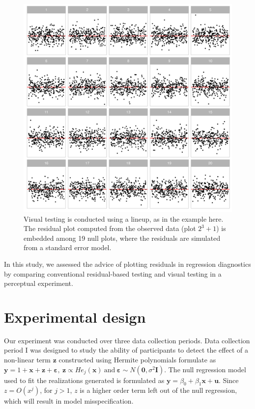 \documentclass{vgtc}                          %
\begin{document}
\begin{figure}[tb]
 \centering %
 \includegraphics[width=\columnwidth]{131}
 \caption{Visual testing is conducted using a lineup, as in the example here. The residual plot computed from the observed data (plot $2^3 + 1$) is embedded among 19 null plots, where the residuals are simulated from a standard error model.}
 \label{fig:first-example-lineup}
\end{figure}

In this study, we assessed the advice of plotting residuals in regression 
diagnostics by comparing conventional residual-based testing 
and visual testing in a perceptual experiment.

\section{Experimental design}
\label{sec:experimental-design}

Our experiment was conducted over three data collection periods. 
Data collection period I was designed to study the ability of
participants to detect the effect of a non-linear term
\(\boldsymbol{z}\) constructed using Hermite polynomials formulate as \(\boldsymbol{y} = 1 + \boldsymbol{x} + \boldsymbol{z} + \boldsymbol{\varepsilon},~ \boldsymbol{z} \propto He_j(\boldsymbol{x}) ~\text{and}~ \boldsymbol{\varepsilon} \sim N(\boldsymbol{0}, \sigma^2\boldsymbol{I}).\) The null regression model used to fit the realizations generated is formulated as 
\(\boldsymbol{y} = \beta_0 + \beta_1 \boldsymbol{x} + \boldsymbol{u}.\) Since 
\(z = O(x^j)\), for \(j > 1\), \(z\) is a higher order term left
out of the null regression, which will result in model misspecification.
\end{document}
